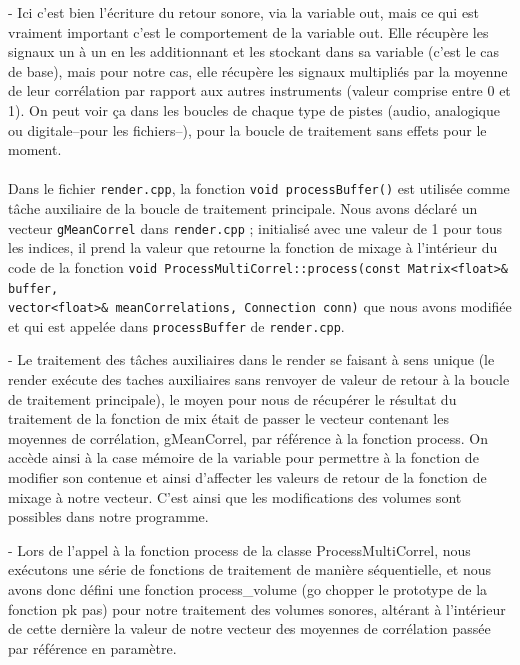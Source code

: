   - Ici c'est bien l'écriture du retour sonore, via la variable out, mais ce
  qui est vraiment important c'est le comportement de la variable out. Elle
  récupère les signaux un à un en les additionnant et les stockant dans sa
  variable (c'est le cas de base), mais pour notre cas, elle récupère les
  signaux multipliés par la moyenne de leur corrélation par rapport aux autres
  instruments (valeur comprise entre 0 et 1). On peut voir ça dans les boucles
  de chaque type de pistes (audio, analogique ou digitale--pour les fichiers--),
  pour la boucle de traitement sans effets pour le moment.

\paragraph{}
Dans le fichier \verb!render.cpp!, la fonction
\verb!void processBuffer()! est utilisée comme tâche auxiliaire de la
boucle de traitement principale. Nous avons déclaré un vecteur
\verb!gMeanCorrel! dans \verb!render.cpp! ; initialisé avec une valeur
de 1 pour tous les indices, il prend la valeur que retourne la
fonction de mixage à l'intérieur du code de la fonction
\verb!void ProcessMultiCorrel::process(const Matrix<float>& buffer,! \\ \verb!vector<float>& meanCorrelations, Connection conn)!
que nous avons modifiée et qui est appelée dans \verb!processBuffer!
de \verb!render.cpp!.

  - Le traitement des tâches auxiliaires dans le render se faisant à sens
  unique (le render exécute des taches auxiliaires sans renvoyer de valeur de
  retour à la boucle de traitement principale), le moyen pour nous de récupérer
  le résultat du traitement de la fonction de mix était de passer le vecteur
  contenant les moyennes de corrélation, gMeanCorrel, par référence à la
  fonction process. On accède ainsi à la case mémoire de la variable pour
  permettre à la fonction de modifier son contenue et ainsi d'affecter les
  valeurs de retour de la fonction de mixage à notre vecteur. C'est ainsi que
  les modifications des volumes sont possibles dans notre programme.

  - Lors de l'appel à la fonction process de la classe ProcessMultiCorrel,
  nous exécutons une série de fonctions de traitement de manière séquentielle,
  et nous avons donc défini une fonction process\_volume (go chopper le prototype
  de la fonction pk pas) pour notre traitement des volumes sonores, altérant à
  l'intérieur de cette dernière la valeur de notre vecteur des moyennes de
  corrélation passée par référence en paramètre.

